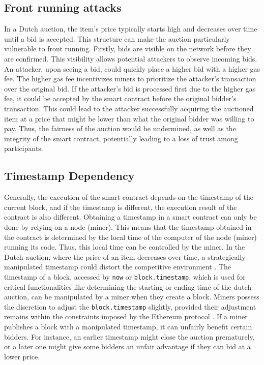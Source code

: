\documentclass[conference]{IEEEtran}
\begin{document}
\subsection{Front running attacks}
In a Dutch auction, the item's price typically starts high and decreases over time until a bid is accepted. This structure can make the auction particularly vulnerable to front running. Firstly, bids are visible on the network before they are confirmed. This visibility allows potential attackers to observe incoming bids. An attacker, upon seeing a bid, could quickly place a higher bid with a higher gas fee. The higher gas fee incentivizes miners to prioritize the attacker’s transaction over the original bid. If the attacker's bid is processed first due to the higher gas fee, it could be accepted by the smart contract before the original bidder’s transaction. This could lead to the attacker successfully acquiring the auctioned item at a price that might be lower than what the original bidder was willing to pay. Thus, the fairness of the auction would be undermined, as well as the integrity of the smart contract, potentially leading to a loss of trust among participants.

\subsection{Timestamp Dependency}
Generally, the execution of the smart contract depends on the timestamp of the current block, and if the timestamp is different, the execution result of the contract is also different. Obtaining a timestamp in a smart contract can only be done by relying on a node (miner). This means that the timestamp obtained in the contract is determined by the local time of the computer of the node (miner) running its code. Thus, this local time can be controlled by the miner. 
In the Dutch auction, where the price of an item decreases over time, a strategically manipulated timestamp could distort the competitive environment \cite[Sec. C.C, p. D]{clark2012security}. The timestamp of a block, accessed by \texttt{now} or \texttt{block.timestamp}, which is used for critical functionalities like determining the starting or ending time of the dutch auction, can be manipulated by a miner when they create a block. Miners possess the discretion to adjust the \texttt{block.timestamp} slightly, provided their adjustment remains within the constraints imposed by the Ethereum protocol \cite[Sec. A.A, p. B]{buterin2014ethereum}. If a miner publishes a block with a manipulated timestamp, it can unfairly benefit certain bidders. For instance, an earlier timestamp might close the auction prematurely, or a later one might give some bidders an unfair advantage if they can bid at a lower price.
\end{document}
